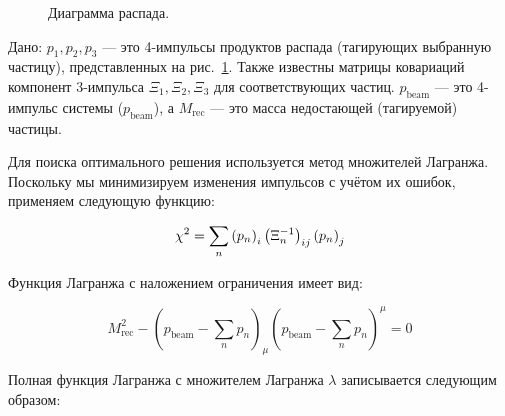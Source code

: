 
\begin{figure}[h!]
    \centering
    \caption{Диаграмма распада.}
    \label{fit_tag}
\end{figure}

Дано: $p_1, p_2, p_3$ --- это 4-импульсы продуктов распада (тагирующих выбранную частицу), представленных на рис.~\ref{fit_tag}. 
Также известны матрицы ковариаций компонент 3-импульса $\Xi_1, \Xi_2, \Xi_3$ для соответствующих частиц. 
$p_{\text{beam}}$ — это 4-импульс системы ($p_{\text{beam}}$), а $M_{\text{rec}}$ --- это масса недостающей (тагируемой) частицы.

Для поиска оптимального решения используется метод множителей Лагранжа. Поскольку мы минимизируем изменения импульсов с учётом их ошибок, применяем следующую функцию:

\begin{equation}
    \chi^2 = \sum_n \left( p_{n} \right)_i  \left( \Xi_n^{-1} \right)_{ij}  \left( p_{n} \right)_j
\end{equation}

Функция Лагранжа с наложением ограничения имеет вид:

\begin{equation}
    M_{\text{rec}}^2 - (p_{\text{beam}} - \sum_n p_n)_\mu (p_{\text{beam}} - \sum_n p_n)^\mu = 0
\end{equation}

Полная функция Лагранжа с множителем Лагранжа $\lambda$ записывается следующим образом:

